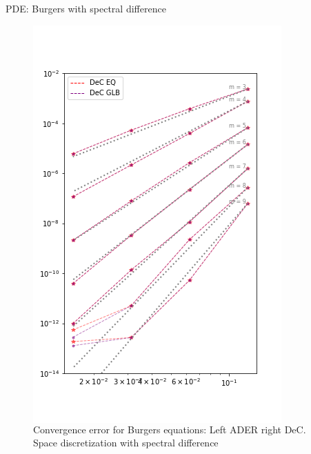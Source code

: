 \documentclass[9pt,compress,t,aspectratio=169]{beamer}
\begin{document}
\begin{frame}{PDE: Burgers with spectral difference}
\begin{figure}
\begin{center}
\begin{columns}
\includegraphics[width=\linewidth,trim={0 55 0 60},clip]{burgers_temp_dec.png}
\caption{Convergence error for Burgers equations: Left ADER right DeC. Space discretization with spectral difference}
\label{fig:advection-conv-dec}
	\end{columns}
\end{center}
\end{figure}

\end{frame}
\end{document}
